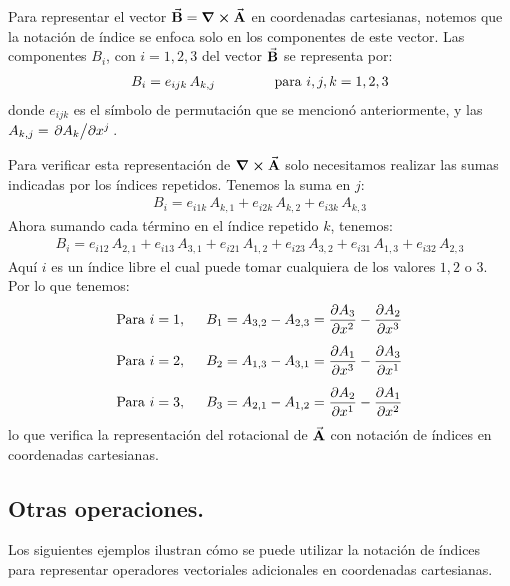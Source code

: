 \documentclass[hidelinks,12pt]{article}
\begin{document}
Para representar el vector $\va{B} = \curl{\va{A}}$ en coordenadas cartesianas, notemos que la notación de índice se enfoca solo en los componentes de este vector. Las componentes $B_{i}$, con $i =1, 2, 3$ del vector $\va{B}$ se representa por:
\begin{align*}
B_{i} = e_{ijk} \, A_{k, j} \hspace{1.5cm} \text{para } i, j, k = 1, 2, 3
\end{align*}
donde $e_{ijk}$ es el símbolo de permutación que se mencionó anteriormente, y las $A_{k,j} = \pdv*{A_{k}}{x^{j}}$.
\par
Para verificar esta representación de $\curl{\va{A}}$ solo necesitamos realizar las sumas indicadas por los índices repetidos. Tenemos la suma en $j$:
\begin{align*}
B_{i} = e_{i1k} \, A_{k,1} + e_{i2k} \, A_{k,2} + e_{i3k} \, A_{k,3}
\end{align*}
Ahora sumando cada término en el índice repetido $k$, tenemos:
\begin{align*}
B_{i} = e_{i12} \, A_{2,1} + e_{i13} \, A_{3,1} + e_{i21} \, A_{1,2} + e_{i23} \, A_{3,2} + e_{i31} \, A_{1,3} + e_{i32} \, A_{2,3}
\end{align*}
Aquí $i$ es un índice libre el cual puede tomar cualquiera de los valores $1, 2$ o $3$. Por lo que tenemos:
\begin{align*}
&\text{Para } i = 1, \hspace{0.5cm} B_{1} = A_{3, 2} - A_{2, 3} = \pdv{A_{3}}{x^{2}} - \pdv{A_{2}}{x^{3}} \\[0.5em]
&\text{Para } i = 2, \hspace{0.5cm} B_{2} = A_{1, 3} - A_{3, 1} = \pdv{A_{1}}{x^{3}} - \pdv{A_{3}}{x^{1}} \\[0.5em]
&\text{Para } i = 3, \hspace{0.5cm} B_{3} = A_{2, 1} - A_{1, 2} = \pdv{A_{2}}{x^{1}} - \pdv{A_{1}}{x^{2}}
\end{align*}
lo que verifica la representación del rotacional de $\va{A}$ con notación de índices en coordenadas cartesianas.

\subsection{Otras operaciones.}

Los siguientes ejemplos ilustran cómo se puede utilizar la notación de índices para representar operadores vectoriales adicionales en coordenadas cartesianas.
\end{document}

